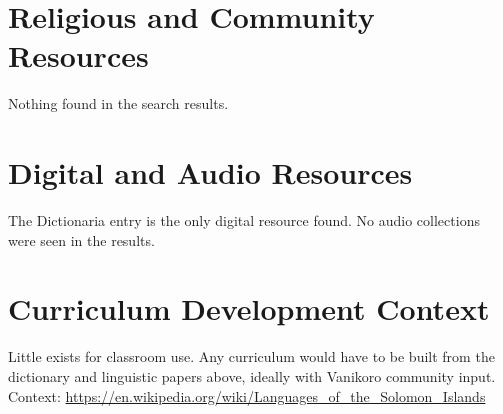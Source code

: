 \documentclass[12pt]{article}
\begin{document}
\section{Religious and Community Resources}
Nothing found in the search results.

\section{Digital and Audio Resources}
The Dictionaria entry is the only digital resource found. No audio collections were seen in the results.

\section{Curriculum Development Context}
Little exists for classroom use. Any curriculum would have to be built from the dictionary and linguistic papers above, ideally with Vanikoro community input. Context: \url{https://en.wikipedia.org/wiki/Languages_of_the_Solomon_Islands}
\end{document}
